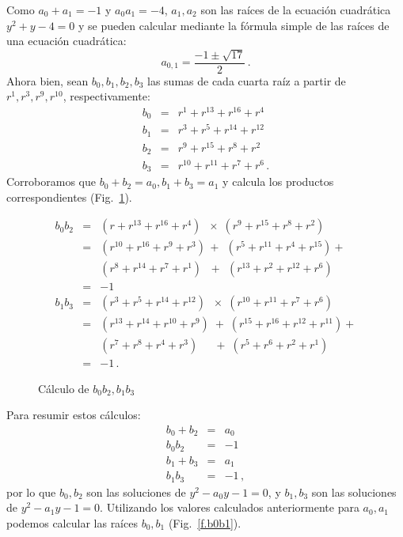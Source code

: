 Como $a_0+a_1=-1$ y $a_0 a_1=-4$, $a_1,a_2$ son las raíces de la ecuación cuadrática $y^2+y-4=0$ y se pueden calcular mediante la fórmula simple de las raíces de una ecuación cuadrática:
\[
a_{0,1} = \frac{-1\pm\sqrt{17}}{2}\,.
\]
Ahora bien, sean $b_0,b_1,b_2,b_3$ las sumas de cada cuarta raíz a partir de $r^1,r^3,r^9,r^{10}$, respectivamente:
\begin{eqnarray*}
b_0&=& r^1+ r^{13} + r^{16} + r^4\\
b_1&=& r^3+ r^{5} + r^{14} + r^{12}\\
b_2&=& r^9+ r^{15} + r^{8} + r^2\\
b_3&=& r^{10}+ r^{11} + r^{7} + r^6\,.
\end{eqnarray*}%
Corroboramos que $b_0+b_2=a_0, b_1+b_3=a_1$ y calcula los productos correspondientes (Fig.~\ref{f.b0213}).
\begin{figure}[t]
\begin{eqnarray*}
b_0b_2&=&(r + r^{13} + r^{16} +r^4)\;\;\times\;(r^9 + r^{15} + r^{8} +r^{2})\\
&=&(r^{10}+r^{16}+r^9+r^3)\,+\;\,(r^{5}+r^{11}+r^4+r^{15})+\\
&&(r^{8}+r^{14}+r^7+r^1)\,\;\,+\;\,(r^{13}+r^{2}+r^{12}+r^6)\\
&=&-1\\
b_1b_3&=&(r^3 + r^{5} + r^{14} +r^{12})\;\;\times\;(r^{10} + r^{11} + r^{7} +r^{6})\\
&=&(r^{13}+r^{14}+r^{10}+r^9)\;+\;(r^{15}+r^{16}+r^{12}+r^{11})+\\
&&(r^{7}+r^{8}+r^4+r^3)\quad\;\, +\;(r^{5}+r^{6}+r^{2}+r^1)\\
&=&-1\,.
\end{eqnarray*}%
\caption{Cálculo de $b_0b_2,b_1b_3$}\label{f.b0213}
\end{figure}
Para resumir estos cálculos:
\begin{eqnarray*}
b_0+b_2&=&a_0\\
b_0b_2&=&-1\\
b_1+b_3&=&a_1\\
b_1b_3&=&-1\,,
\end{eqnarray*}%
por lo que $b_0,b_2$ son las soluciones de $y^2-a_0y-1= 0$, y $b_1,b_3$ son las soluciones de $y^2-a_1y-1 =0$. Utilizando los valores calculados anteriormente para $a_0,a_1$ podemos calcular las raíces $b_0,b_1$ (Fig.~\ref{f.b0b1}).
